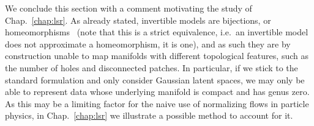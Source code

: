 \medskip

We conclude this section with a comment motivating the study of Chap.~\ref{chap:lsr}. As already stated, invertible models are bijections, or homeomorphisms~\cite{dupont2019augmented,  huang2020augmented} (note that this is a strict equivalence, i.e.\ an invertible model does not approximate a homeomorphism, it is one), and as such they are by construction unable to map manifolds with different topological features, such as the number of holes and disconnected patches. In particular, if we stick to the standard formulation and only consider Gaussian latent spaces, we may only be able to represent data whose underlying manifold is compact and has genus zero. As this may be a limiting factor for the naive use of normalizing flows in particle physics, in Chap.~\ref{chap:lsr} we illustrate a possible method to account for it.


